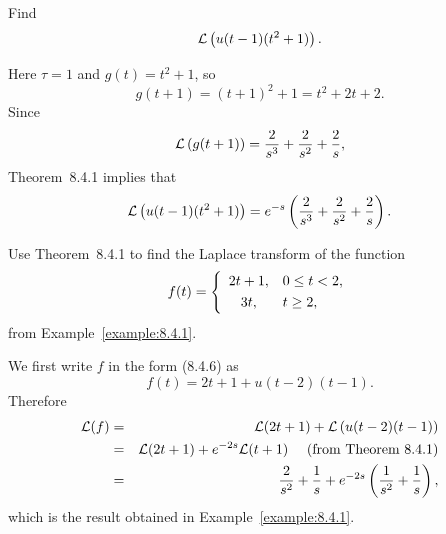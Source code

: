 \setcounter{example}{1}
\begin{example}
  \label{example:8.4.2}\rm Find
  \[
    {\cal L}\left(u(t-1)(t^{2}+1)\right).
  \]
\end{example}
\begin{examplesolution}
\solution Here $\tau=1$ and $g(t)=t^{2}+1$, so
\[
  g(t+1)=(t+1)^{2}+1=t^{2}+2t+2.
\]
Since
\[
  {\cal L}\left(g(t+1)\right)=\frac{2}{s^{3}}+\frac{2}{s^{2}}+\frac{2}{s},
\]
Theorem~8.4.1 implies that
\[
  {\cal L}\left(u(t-1)(t^{2}+1)\right) =e^{-s}\left(\frac{2}{s^{3}}+\frac{2}{s^{2}}+\frac{2}{s}\right).
\]
\end{examplesolution}

\setcounter{example}{2}
\begin{example}
  \label{example:8.4.3}\rm Use Theorem~8.4.1 to find the Laplace transform of the
  function
  \[
    f(t)=\left\{
    \begin{array}{cl}
      2t+1, & 0\le t<2, \\[1\jot]
      3t,   & t\ge2,
    \end{array}\right.
  \]
  from Example~\ref{example:8.4.1}.
\end{example}
\begin{examplesolution}
\solution We first write $f$ in the form \textup{(8.4.6)} as
\[
  f(t)=2t+1+u(t-2)(t-1).
\]
Therefore
\begin{eqnarray*}
  {\cal L}(f) & = & {\cal L}(2t+1)+{\cal L}\left(u(t-2)(t-1)\right)                                    \\
              & = & {\cal L}(2t+1)+e^{-2s}{\cal L}(t+1)\quad\mbox{ (from Theorem~8.4.1}) \\
              & = & \frac{2}{s^{2}}+\frac{1}{s}+e^{-2s}\left(\frac{1}{s^{2}}+\frac{1}{s}\right),
\end{eqnarray*}
which is the result obtained in Example~\ref{example:8.4.1}.\bbox
\end{examplesolution}

